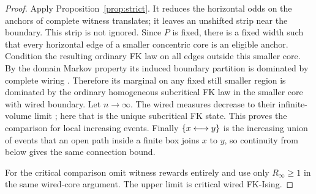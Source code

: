 \begin{proof}
Apply Proposition~\ref{prop:strict}. It reduces the horizontal odds on the anchors of complete witness translates; it leaves an unshifted strip near the boundary. This strip is not ignored. Since \(P\) is fixed, there is a fixed width such that every horizontal edge of a smaller concentric core is an eligible anchor. Condition the resulting ordinary FK law on all edges outside this smaller core. By the domain Markov property its induced boundary partition is dominated by complete wiring \cite[Lemmas 4.13--4.14]{Grimmett}. Therefore its marginal on any fixed still smaller region is dominated by the ordinary homogeneous subcritical FK law in the smaller core with wired boundary. Let \(n\to\infty\). The wired measures decrease to their infinite-volume limit \cite[Theorem 4.19]{Grimmett}; here that is the unique subcritical FK state. This proves the comparison for local increasing events. Finally $\{x\longleftrightarrow y\}$ is the increasing union of events that an open path inside a finite box joins $x$ to $y$, so continuity from below gives the same connection bound.

For the critical comparison omit witness rewards entirely and use only \(R_\infty\ge1\) in the same wired-core argument. The upper limit is critical wired FK-Ising.
\end{proof}
